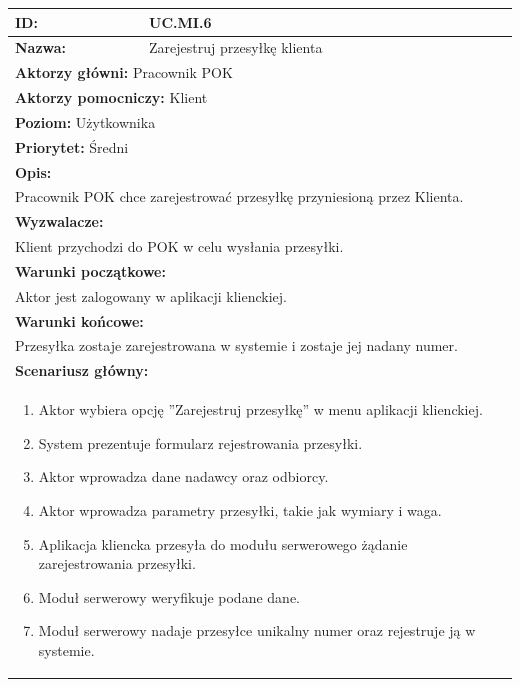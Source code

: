 \begin{center}
\begin{longtable}[h]{|p{1.6cm}|p{13.5cm}|}
\hline
\textbf{ID:} & UC.MI.6 \\ \hline
\textbf{Nazwa:} & Zarejestruj przesyłkę klienta \\ \hline
\multicolumn{2}{|p{15.1cm}|}{\textbf{Aktorzy główni:} Pracownik POK} \\
\multicolumn{2}{|p{15.1cm}|}{\textbf{Aktorzy pomocniczy:} Klient} \\
\multicolumn{2}{|p{15.1cm}|}{\textbf{Poziom:} Użytkownika} \\
\multicolumn{2}{|p{15.1cm}|}{\textbf{Priorytet:} Średni} \\
\hline
\multicolumn{2}{|p{15.1cm}|}{\textbf{Opis:}} \\
\multicolumn{2}{|p{15.1cm}|}{
Pracownik POK chce zarejestrować przesyłkę przyniesioną przez Klienta.
} \\ \hline
\multicolumn{2}{|p{15.1cm}|}{\textbf{Wyzwalacze:}} \\
\multicolumn{2}{|p{15.1cm}|}{
Klient przychodzi do POK w celu wysłania przesyłki.
} \\ \hline
\multicolumn{2}{|p{15.1cm}|}{\textbf{Warunki początkowe:}} \\
\multicolumn{2}{|p{15.1cm}|}{
Aktor jest zalogowany w aplikacji klienckiej.
} \\ \hline
\multicolumn{2}{|p{15.1cm}|}{\textbf{Warunki końcowe:}} \\
\multicolumn{2}{|p{15.1cm}|}{
Przesyłka zostaje zarejestrowana w systemie i zostaje jej nadany numer.
} \\ \hline
\multicolumn{2}{|p{15.1cm}|}{\textbf{Scenariusz główny:}} \\
\multicolumn{2}{|p{15.1cm}|}{
\begin{enumerate}
\item Aktor wybiera opcję ''Zarejestruj przesyłkę'' w menu aplikacji klienckiej.
\item System prezentuje formularz rejestrowania przesyłki.
\item Aktor wprowadza dane nadawcy oraz odbiorcy.
\item Aktor wprowadza parametry przesyłki, takie jak wymiary i waga.
\item Aplikacja kliencka przesyła do modułu serwerowego żądanie zarejestrowania przesyłki.
\item Moduł serwerowy weryfikuje podane dane.
\item Moduł serwerowy nadaje przesyłce unikalny numer oraz rejestruje ją w systemie.

\end{enumerate}}
\end{longtable}
\end{center}
